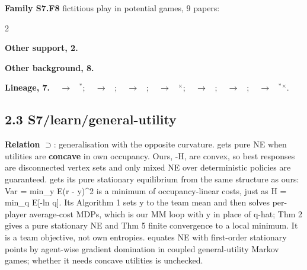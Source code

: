 \documentclass[10pt]{article}
\newcommand{\memb}[1]{\par\smallskip\textbf{#1}\quad}
\begin{document}
\memb{Family S7.F8} fictitious play in potential games, 9 papers: {\footnotesize \citetext{\citealp{MondererShapley-fictitious96}; \citealp{Hofbauer-global02}; \citealp{Swenson-best18}; \citealp{Shapley-some64}\dag; \citealp{Gaunersdorfer-fictitious95}\dag; \citealp{Monderer-game96}\dag; \citealp{Marden-joint09}\dag; \citealp{Swenson-exponential17}; \citealp{Panageas-exponential23}}}

\begin{multicols}{2}
\memb{Other support, 2.} \citetext{\citealp{Sandholm-potential01}; \citealp{Kleinberg-multiplicative09}}

\memb{Other background, 8.} {\footnotesize \citetext{\citealp{Hart-simple00}; \citealp{Hofbauer-evolutionary03}; \citealp{Marden-cooperative09}\dag; \citealp{Candogan-flows11}; \citealp{Candogan-learning11}; \citealp{Candogan-dynamics13}; \citealp{Yongacoglu-satisficing23}; \citealp{Yongacoglu-satisficing24}}}

\end{multicols}
\memb{Lineage, 7.} {\footnotesize \citeauthor{Shapley-some64}~\citeyear{Shapley-some64} $\to$ \citeauthor{Gaunersdorfer-fictitious95}~\citeyear{Gaunersdorfer-fictitious95}$^\ast$; \citeauthor{Shapley-some64}~\citeyear{Shapley-some64} $\to$ \citeauthor{MondererShapley-fictitious96}~\citeyear{MondererShapley-fictitious96}; \citeauthor{Young-evolution93}~\citeyear{Young-evolution93} $\to$ \citeauthor{Candogan-learning11}~\citeyear{Candogan-learning11}; \citeauthor{Monderer-potential96}~\citeyear{Monderer-potential96} $\to$ \citeauthor{MondererShapley-fictitious96}~\citeyear{MondererShapley-fictitious96}$^\times$; \citeauthor{MondererShapley-fictitious96}~\citeyear{MondererShapley-fictitious96} $\to$ \citeauthor{Kleinberg-multiplicative09}~\citeyear{Kleinberg-multiplicative09}; \citeauthor{MondererShapley-fictitious96}~\citeyear{MondererShapley-fictitious96} $\to$ \citeauthor{Swenson-best18}~\citeyear{Swenson-best18}; \citeauthor{Monderer-potential96}~\citeyear{Monderer-potential96} $\to$ \citeauthor{Leonardos-global21}~\citeyear{Leonardos-global21}$^\ast$$^\times$.}

\subsection{2.3 S7/learn/general-utility}\label{node:S7-S7-learn-general-utility}
\textbf{Relation} $\supset$: generalisation with the opposite curvature. \citet{Gemp-convex24} gets pure NE when utilities are \textbf{concave} in own occupancy. Ours, -H, are convex, so best responses are disconnected vertex sets and only mixed NE over deterministic policies are guaranteed. \citet{Xia-team25} gets its pure stationary equilibrium from the same structure as ours: Var = min\_y E(r - y)\^{}2 is a minimum of occupancy-linear costs, just as H = min\_q E[-ln q]. Its Algorithm 1 sets y to the team mean and then solves per-player average-cost MDPs, which is our MM loop with y in place of q-hat; Thm 2 gives a pure stationary NE and Thm 5 finite convergence to a local minimum. It is a team objective, not own entropies. \citet{Barakat-convex26} equates NE with first-order stationary points by agent-wise gradient domination in coupled general-utility Markov games; whether it needs concave utilities is unchecked.
\end{document}
